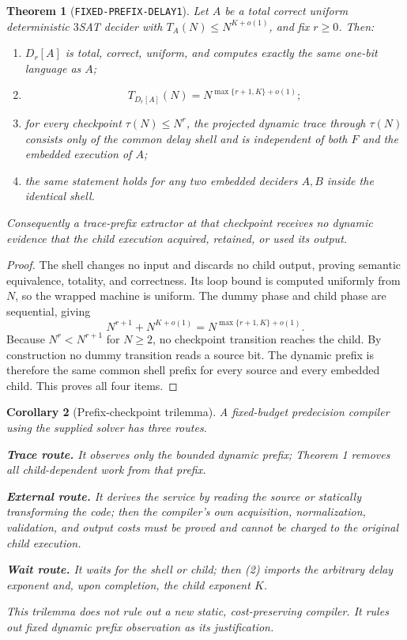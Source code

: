 \documentclass[11pt]{article}
\newtheorem{theorem}{Theorem}
\newtheorem{corollary}[theorem]{Corollary}
\begin{document}
\begin{theorem}[\texttt{FIXED-PREFIX-DELAY1}]
Let $A$ be a total correct uniform deterministic $3$SAT decider with
$T_A(N)\le N^{K+o(1)}$, and fix $r\ge0$.
Then:
\begin{enumerate}[label=(\roman*)]
\item $D_r[A]$ is total, correct, uniform, and computes exactly the same
one-bit language as $A$;
\item
\[
 T_{D_r[A]}(N)=N^{\max\{r+1,K\}+o(1)};                  \tag{2}
\]
\item for every checkpoint $\tau(N)\le N^r$, the projected dynamic trace
through $\tau(N)$ consists only of the common delay shell and is independent
of both $F$ and the embedded execution of $A$;
\item the same statement holds for any two embedded deciders $A,B$ inside
the identical shell.
\end{enumerate}
Consequently a trace-prefix extractor at that checkpoint receives no dynamic
evidence that the child execution acquired, retained, or used its output.
\end{theorem}

\begin{proof}
The shell changes no input and discards no child output, proving semantic
equivalence, totality, and correctness.  Its loop bound is computed uniformly
from $N$, so the wrapped machine is uniform.  The dummy phase and child phase
are sequential, giving
\[
 N^{r+1}+N^{K+o(1)}=N^{\max\{r+1,K\}+o(1)}.
\]
Because $N^r<N^{r+1}$ for $N\ge2$, no checkpoint transition reaches the
child.  By construction no dummy transition reads a source bit.  The dynamic
prefix is therefore the same common shell prefix for every source and every
embedded child.  This proves all four items.
\end{proof}

\begin{corollary}[Prefix-checkpoint trilemma]
A fixed-budget predecision compiler using the supplied solver has three
routes.
\begin{description}[leftmargin=0cm,labelwidth=0cm]
\item[] \textbf{Trace route.}  It observes only the bounded dynamic prefix;
Theorem 1 removes all child-dependent work from that prefix.
\item[] \textbf{External route.}  It derives the service by reading the source
or statically transforming the code; then the compiler's own acquisition,
normalization, validation, and output costs must be proved and cannot be
charged to the original child execution.
\item[] \textbf{Wait route.}  It waits for the shell or child; then (2) imports
the arbitrary delay exponent and, upon completion, the child exponent $K$.
\end{description}
This trilemma does not rule out a new static, cost-preserving compiler.  It
rules out fixed dynamic prefix observation as its justification.
\end{corollary}
\end{document}
